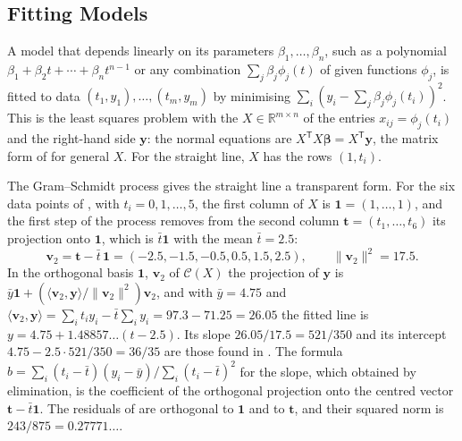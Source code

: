 \subsection{Fitting Models}

A model that depends linearly on its parameters $\beta_1,\ldots,\beta_n$, such as a polynomial $\beta_1+\beta_2t+\cdots+\beta_nt^{n-1}$ or any combination $\sum_j\beta_j\phi_j(t)$ of given functions $\phi_j$, is fitted to data $(t_1,y_1),\ldots,(t_m,y_m)$ by minimising $\sum_i(y_i-\sum_j\beta_j\phi_j(t_i))^2$. This is the least squares problem with the  $X\in\mathbb R^{m\times n}$ of the entries $x_{ij}=\phi_j(t_i)$ and the right-hand side $\mathbf y$: the normal equations are $X^{\mathsf T}X\boldsymbol\beta=X^{\mathsf T}\mathbf y$, the matrix form of  for general $X$. For the straight line, $X$ has the rows $(1,t_i)$.

The Gram--Schmidt process gives the straight line a transparent form. For the six data points of , with $t_i=0,1,\ldots,5$, the first column of $X$ is $\mathbf 1=(1,\ldots,1)$, and the first step of the process removes from the second column $\mathbf t=(t_1,\ldots,t_6)$ its projection onto $\mathbf 1$, which is $\bar t\mathbf 1$ with the mean $\bar t=2.5$:
\[
\mathbf v_2=\mathbf t-\bar t\,\mathbf 1=(-2.5,-1.5,-0.5,0.5,1.5,2.5),\qquad\|\mathbf v_2\|^2=17.5 .
\]
In the orthogonal basis $\mathbf 1$, $\mathbf v_2$ of $\mathcal C(X)$ the projection of $\mathbf y$ is $\bar y\mathbf 1+(\langle\mathbf v_2,\mathbf y\rangle/\|\mathbf v_2\|^2)\mathbf v_2$, and with $\bar y=4.75$ and $\langle\mathbf v_2,\mathbf y\rangle=\sum_it_iy_i-\bar t\sum_iy_i=97.3-71.25=26.05$ the fitted line is $y=4.75+1.48857\ldots(t-2.5)$. Its slope $26.05/17.5=521/350$ and its intercept $4.75-2.5\cdot521/350=36/35$ are those found in . The formula $b=\sum_i(t_i-\bar t)(y_i-\bar y)/\sum_i(t_i-\bar t)^2$ for the slope, which  obtained by elimination, is the coefficient of the orthogonal projection onto the centred vector $\mathbf t-\bar t\mathbf 1$. The residuals of  are orthogonal to $\mathbf 1$ and to $\mathbf t$, and their squared norm is $243/875=0.27771\ldots$.

